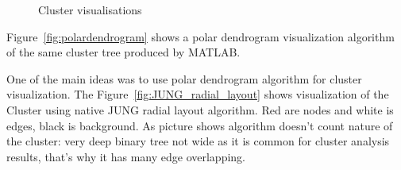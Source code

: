\begin{figure}[h!]
\centering
{}
\label{fig:dendrograms}
\caption{Cluster visualisations}
\end{figure}


Figure~\ref{fig:polardendrogram} shows a polar dendrogram visualization algorithm of the same cluster tree produced by MATLAB.

One of the main ideas was to use polar dendrogram algorithm for cluster visualization. The Figure~\ref{fig:JUNG_radial_layout} shows visualization of the Cluster using native JUNG radial layout algorithm. Red are nodes and white is edges, black is background. As picture shows algorithm doesn't count nature of the cluster: very deep binary tree not wide as it is common for cluster analysis results, that's why it has many edge overlapping.


